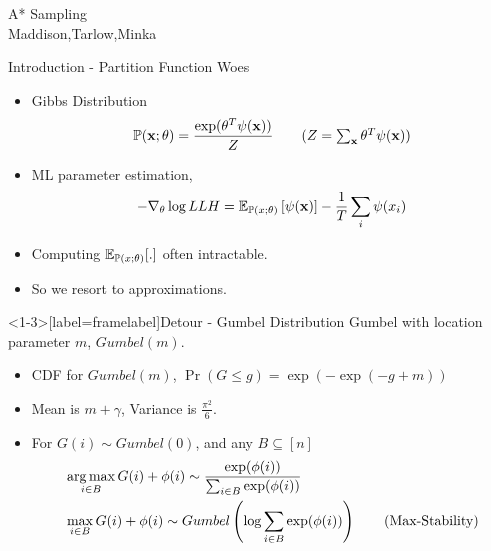 \begin{frame}
  \begin{center}
    {\huge A* Sampling
    } \\
    Maddison,Tarlow,Minka
  \end{center}
\end{frame}

\begin{frame}{Introduction - Partition Function Woes}
  \begin{itemize}
  \item Gibbs Distribution
    \begin{align*}
      \Pr(\x;\theta) =\frac{\exp(\theta^T\psi(\x))}{Z} \tag{$Z=\sum_{\x} \theta^T\psi(\x)$}
    \end{align*}
  \item ML parameter estimation,
    \begin{align*}
      - \nabla_\theta \log LLH = \operatorname{\mathbb{E}}_{\mathbb{P}(x;\theta)}\left[\psi(\operatorname{\mathbf{x}})\right] - \frac{1}{T} \sum_i\psi(x_i)
    \end{align*}
  \item   Computing $\operatorname{\mathbb{E}}_{\mathbb{P}(x;\theta)}[.]$ often intractable.
  \item So we resort to approximations. %
  \end{itemize}
\end{frame}

\begin{frame}<1-3>[label=framelabel]{Detour - Gumbel Distribution}
  Gumbel with location parameter $m$, $Gumbel(m)$.
  \begin{itemize}
  \item CDF for $Gumbel(m)$, $\Pr(G\le g) = \exp(-\exp(-g+m))$ \\
    \pause
  \item Mean is $m+\gamma$, Variance is $\frac{\pi^2}{6}$.
    \pause
  \item\alert<4->{For $G(i) \sim Gumbel(0)$, and any $B \subseteq [n]$
    \begin{align*}
      & \operatorname*{{arg\,max}}_{i \in B}{G(i)+\phi(i)} \sim \frac{\exp(\phi(i))}{\sum_{i \in B} \exp(\phi(i))} \\
      & \max_{i \in B}{G(i)+\phi(i)} \sim Gumbel\left(\log \sum_{i \in B} \exp(\phi(i))\right) \tag{Max-Stability}
    \end{align*}
  }
  \end{itemize}
\end{frame}

